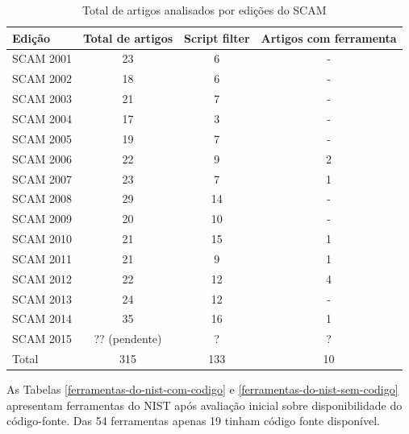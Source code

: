 \documentclass[qual, classic, a4paper]{ufbathesis}
\begin{document}
\begin{table}
\caption{Total de artigos analisados por edições do SCAM}
\centering
\begin{tabular}{| l | c | c | c |}
\hline
Edição    & Total de artigos & Script filter & Artigos com ferramenta \\
\hline
SCAM 2001 & 23               & 6             & -                      \\
SCAM 2002 & 18               & 6             & -                      \\
SCAM 2003 & 21               & 7             & -                      \\
SCAM 2004 & 17               & 3             & -                      \\
SCAM 2005 & 19               & 7             & -                      \\
SCAM 2006 & 22               & 9             & 2                      \\
SCAM 2007 & 23               & 7             & 1                      \\
SCAM 2008 & 29               & 14            & -                      \\
SCAM 2009 & 20               & 10            & -                      \\
SCAM 2010 & 21               & 15            & 1                      \\
SCAM 2011 & 21               & 9             & 1                      \\
SCAM 2012 & 22               & 12            & 4                      \\
SCAM 2013 & 24               & 12            & -                      \\
SCAM 2014 & 35               & 16            & 1                      \\
SCAM 2015 & ?? (pendente)    & ?             & ?                      \\
\hline
Total     & 315              & 133           & 10                     \\
\hline
\end{tabular}
\label{artigos-do-scam}
\end{table}

As Tabelas \ref{ferramentas-do-nist-com-codigo} e
\ref{ferramentas-do-nist-sem-codigo} apresentam ferramentas do NIST após
avaliação inicial sobre disponibilidade do código-fonte. Das 54 ferramentas
apenas 19 tinham código fonte disponível.
\end{document}
